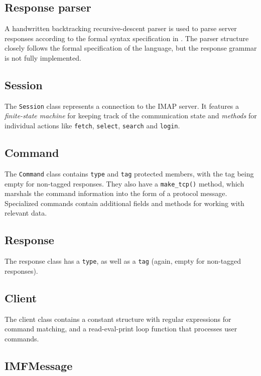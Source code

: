 \documentclass[a4]{report}
\begin{document}
\subsection{Response parser}

A handwritten backtracking recursive-descent parser is used to parse server responses according to the formal syntax specification in \cite{rfc3501}. The parser structure closely follows the formal specification of the language, but the response grammar is not fully implemented.

\subsection{Session}

The \texttt{Session} class represents a connection to the IMAP server. It features a \textit{finite-state machine} for keeping track of the communication state and \textit{methods} for individual actions like \texttt{fetch}, \texttt{select}, \texttt{search} and \texttt{login}.

\subsection{Command}

The \texttt{Command} class contains \texttt{type} and \texttt{tag} protected members, with the tag being empty for non-tagged responses. They also have a \texttt{make\_tcp()} method, which marshals the command information into the form of a protocol message. Specialized commands contain additional fields and methods for working with relevant data.

\subsection{Response}

The response class has a \texttt{type}, as well as a \texttt{tag} (again, empty for non-tagged responses).

\subsection{Client}

The client class contains a constant structure with regular expressions for command matching, and a read-eval-print loop function that processes user commands.

\subsection{IMFMessage}
\end{document}
